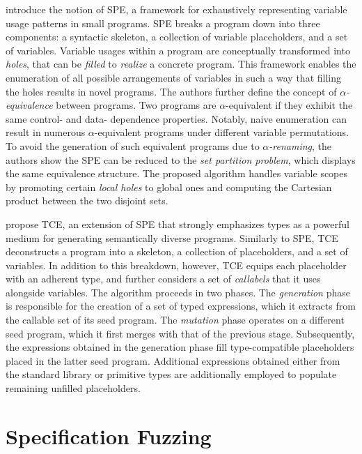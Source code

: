 \citet{zhang2017skeletal} introduce the notion of \gls{SPE}, a framework
for exhaustively representing variable usage patterns in small programs.
\gls{SPE} breaks a program down into three components: a syntactic skeleton,
a collection of variable placeholders, and a set of variables.
Variable usages within a program are conceptually transformed into \textit{holes},
that can be \textit{filled} to \textit{realize} a concrete program.
This framework enables the enumeration of all possible arrangements
of variables in such a way that filling the holes results in novel programs.
The authors further define the concept of $\alpha$\textit{-equivalence} between
programs.
Two programs are $\alpha$-equivalent if they exhibit the same control- and data-
dependence properties.
Notably, naive enumeration can result in numerous $\alpha$-equivalent programs
under different variable permutations.
To avoid the generation of such equivalent programs due to $\alpha$\textit{-renaming},
the authors show the \gls{SPE} can be reduced to the \textit{set partition problem},
which displays the same equivalence structure.
The proposed algorithm handles variable scopes by promoting certain
\textit{local holes} to global ones and computing the Cartesian product 
between the two disjoint sets.


\citet{stepanov2021type} propose \Gls{TCE}, an extension of \gls{SPE} 
that strongly emphasizes types as a powerful medium for generating
semantically diverse programs.
Similarly to \gls{SPE}, \gls{TCE} deconstructs a program into a 
skeleton, a collection of placeholders, and a set of variables.
In addition to this breakdown, however, \gls{TCE} equips each 
placeholder with an adherent type, and further considers a set
of \textit{callabels} that it uses alongside variables.
The algorithm proceeds in two phases.
The \textit{generation} phase is responsible for the 
creation of a set of typed expressions, which it extracts from
the callable set of its seed program.
The \textit{mutation} phase operates on a different seed program,
which it first merges with that of the previous stage.
Subsequently, the expressions obtained in the generation phase
fill type-compatible placeholders placed in the latter seed program.
Additional expressions obtained either from the standard library 
or primitive types are additionally employed to populate
remaining unfilled placeholders.

\section{\label{sec:specification_fuzzing}Specification Fuzzing}


